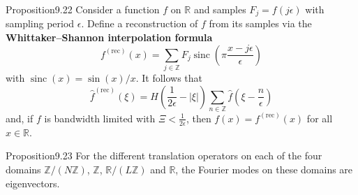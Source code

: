 \begin{res}{Proposition}{9.22}
Consider a function $f$ on $\mathbb R$ and samples $F_j=f(j\epsilon)$ with sampling period $\epsilon$. Define a reconstruction of $f$ from its samples via the \textbf{Whittaker--Shannon interpolation formula}
\begin{equation}f^{(\mathrm{rec})}(x)=\sum_{j\in\mathbb Z}F_j\operatorname{sinc}\left(\pi\frac{x-j\epsilon}{\epsilon}\right)\tag{9.127}\end{equation}
with $\operatorname{sinc}(x)=\sin(x)/x$. It follows that
\begin{equation}\widehat{f}^{(\mathrm{rec})}(\xi)=H\left(\frac1{2\epsilon}-|\xi|\right)\sum_{n\in\mathbb Z}\widehat f\left(\xi-\frac n\epsilon\right)\tag{9.128}\end{equation}
and, if $f$ is bandwidth limited with $\Xi<\frac1{2\epsilon}$, then $f(x)=f^{(\mathrm{rec})}(x)$ for all $x\in\mathbb R$.
\end{res}

\begin{res}{Proposition}{9.23}
For the different translation operators on each of the four domains $\mathbb Z/(N\mathbb Z)$, $\mathbb Z$, $\mathbb R/(L\mathbb Z)$ and $\mathbb R$, the Fourier modes on these domains are eigenvectors.
\end{res}
